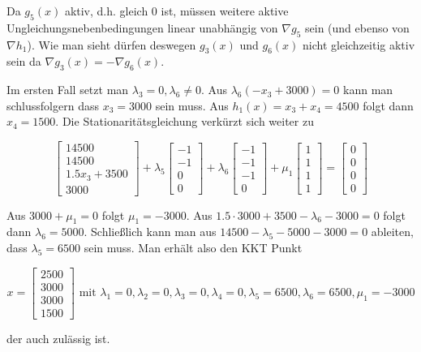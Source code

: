 \documentclass[a4paper, 12pt]{report}
\begin{document}
Da $g_5(x)$ aktiv, d.h. gleich $0$ ist, müssen weitere aktive Ungleichungsnebenbedingungen linear unabhängig von $\nabla g_5$ sein (und ebenso von $\nabla h_1$).
Wie man sieht dürfen deswegen $g_3(x)$ und $g_6(x)$ nicht gleichzeitig aktiv sein da $\nabla g_3(x) = -\nabla g_6(x)$.\par



Im ersten Fall setzt man $\lambda_3 = 0, \lambda_6 \neq 0$. Aus $\lambda_6(-x_3 + 3000) = 0$ kann man schlussfolgern dass $x_3 = 3000$
sein muss. Aus $h_1(x) = x_3 + x_4 = 4500$ folgt dann $x_4 = 1500$. Die Stationaritätsgleichung verkürzt sich weiter zu

$$ \begin{bmatrix}14500\\14500\\1.5x_3 + 3500\\3000\end{bmatrix} + \lambda_5 \begin{bmatrix}-1\\-1\\0\\0\end{bmatrix} + \lambda_6 \begin{bmatrix} -1\\-1\\-1\\0 \end{bmatrix} + \mu_1 \begin{bmatrix}1\\1\\1\\1\end{bmatrix} = \begin{bmatrix}0\\0\\0\\0\end{bmatrix} $$

Aus $3000 + \mu_1 = 0$ folgt $\mu_1 = -3000$. Aus $1.5 \cdot 3000 + 3500 - \lambda_6 - 3000 = 0$ folgt dann $\lambda_6 = 5000$.
Schließlich kann man aus $14500 - \lambda_5 - 5000 - 3000 = 0$ ableiten, dass $\lambda_5 = 6500$ sein muss. Man erhält also
den KKT Punkt

$$ x = \begin{bmatrix}2500\\3000\\3000\\1500\end{bmatrix} \text{ mit } \lambda_1 = 0, \lambda_2 = 0, \lambda_3 = 0, \lambda_4 = 0, \lambda_5 = 6500, \lambda_6 = 6500, \mu_1 = -3000$$

der auch zulässig ist.\par
\end{document}
